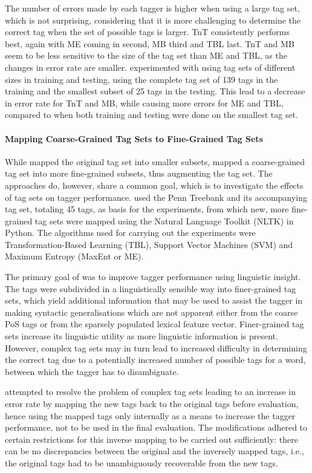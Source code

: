 \documentclass[a4paper,12pt,english]{book}
\begin{document}
The number of errors made by each tagger is higher when using a large tag set,
which is not surprising, considering that it is more challenging to determine
the correct tag when the set of possible tags is larger. TnT consistently
performs best, again with ME coming in second, MB third and TBL last. TnT and
MB seem to be less sensitive to the size of the tag set than ME and TBL, as the
changes in error rate are smaller.  experimented with using tag
sets of different sizes in training and testing, using the complete tag set of
139 tags in the training and the smallest subset of 25 tags in the testing.
This lead to a decrease in error rate for TnT and MB, while causing more errors
for ME and TBL, compared to when both training and testing were done on the
smallest tag set.

\paragraph{Mapping Coarse-Grained Tag Sets to Fine-Grained Tag Sets}
While  mapped the original tag set into smaller subsets,
 mapped a coarse-grained tag set into more fine-grained subsets,
thus augmenting the tag set. The approaches do, however, share a common goal,
which is to investigate the effects of tag sets on tagger performance.
\citeauthor{Mac:05} used the Penn Treebank and its accompanying tag set,
totaling 45 tags, as basis for the experiments, from which new, more
fine-grained tag sets were mapped using the Natural Language Toolkit (NLTK) in
Python. The algorithms used for carrying out the experiments were
Transformation-Based Learning (TBL), Support Vector Machines (SVM) and Maximum
Entropy (MaxEnt or ME).

The primary goal of  was to improve tagger performance using
linguistic insight. The tags were subdivided in a linguistically sensible way
into finer-grained tag sets, which yield additional information that may be
used to assist the tagger in making syntactic generalisations which are not
apparent either from the coarse PoS tags or from the sparsely populated lexical
feature vector. Finer-grained tag sets increase its linguistic utility as more
linguistic information is present. However, complex tag sets may in turn lead
to increased difficulty in determining the correct tag due to a potentially
increased number of possible tags for a word, between which the tagger has to
disambiguate.

 attempted to resolve the problem of complex tag sets leading to an
increase in error rate by mapping the new tags back to the original tags
before evaluation, hence using the mapped tags only internally as a means to
increase the tagger performance, not to be used in the final evaluation. The
modifications adhered to certain restrictions for this inverse mapping to
be carried out sufficiently: there can be no discrepancies between the original
and the inversely mapped tags, i.e., the original tags had to be unambiguously
recoverable from the new tags.
\end{document}
